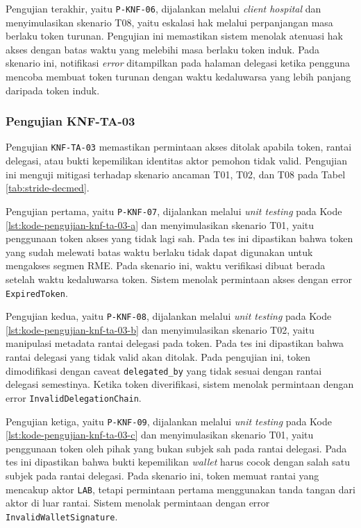 Pengujian terakhir, yaitu \texttt{P-KNF-06}, dijalankan melalui \textit{client hospital} dan menyimulasikan skenario T08, yaitu eskalasi hak melalui perpanjangan masa berlaku token turunan. Pengujian ini memastikan sistem menolak atenuasi hak akses dengan batas waktu yang melebihi masa berlaku token induk. Pada skenario ini, notifikasi \textit{error} ditampilkan pada halaman delegasi ketika pengguna mencoba membuat token turunan dengan waktu kedaluwarsa yang lebih panjang daripada token induk.

\subsubsection{Pengujian KNF-TA-03}
\label{subsubsec:pengujian-knf-ta-03}

Pengujian \texttt{KNF-TA-03} memastikan permintaan akses ditolak apabila token, rantai delegasi, atau bukti kepemilikan identitas aktor pemohon tidak valid. Pengujian ini menguji mitigasi terhadap skenario ancaman T01, T02, dan T08 pada Tabel \ref{tab:stride-decmed}.

Pengujian pertama, yaitu \texttt{P-KNF-07}, dijalankan melalui \textit{unit testing} pada Kode \ref{lst:kode-pengujian-knf-ta-03-a} dan menyimulasikan skenario T01, yaitu penggunaan token akses yang tidak lagi sah. Pada tes ini dipastikan bahwa token yang sudah melewati batas waktu berlaku tidak dapat digunakan untuk mengakses segmen RME. Pada skenario ini, waktu verifikasi dibuat berada setelah waktu kedaluwarsa token. Sistem menolak permintaan akses dengan error \texttt{ExpiredToken}.

Pengujian kedua, yaitu \texttt{P-KNF-08}, dijalankan melalui \textit{unit testing} pada Kode \ref{lst:kode-pengujian-knf-ta-03-b} dan menyimulasikan skenario T02, yaitu manipulasi metadata rantai delegasi pada token. Pada tes ini dipastikan bahwa rantai delegasi yang tidak valid akan ditolak. Pada pengujian ini, token dimodifikasi dengan caveat \texttt{delegated\_by} yang tidak sesuai dengan rantai delegasi semestinya. Ketika token diverifikasi, sistem menolak permintaan dengan error \texttt{InvalidDelegationChain}.

Pengujian ketiga, yaitu \texttt{P-KNF-09}, dijalankan melalui \textit{unit testing} pada Kode \ref{lst:kode-pengujian-knf-ta-03-c} dan menyimulasikan skenario T01, yaitu penggunaan token oleh pihak yang bukan subjek sah pada rantai delegasi. Pada tes ini dipastikan bahwa bukti kepemilikan \textit{wallet} harus cocok dengan salah satu subjek pada rantai delegasi. Pada skenario ini, token memuat rantai yang mencakup aktor \texttt{LAB}, tetapi permintaan pertama menggunakan tanda tangan dari aktor di luar rantai. Sistem menolak permintaan dengan error \texttt{InvalidWalletSignature}.

